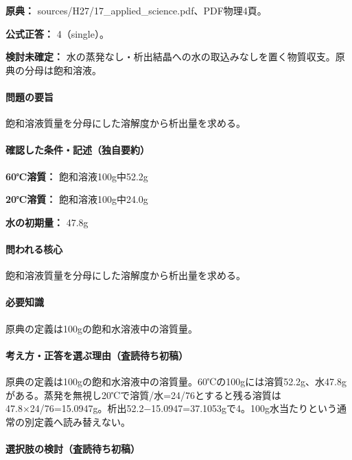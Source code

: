 \noindent\textbf{原典：} sources/H27/17\_applied\_science.pdf、PDF物理4頁。

\textbf{公式正答：} 4（single）。

\par\textbf{検討未確定：} 水の蒸発なし・析出結晶への水の取込みなしを置く物質収支。原典の分母は飽和溶液。

\paragraph{問題の要旨} 飽和溶液質量を分母にした溶解度から析出量を求める。

\paragraph{確認した条件・記述（独自要約）}\mbox{}\par

\noindent\textbf{60℃溶質：} 飽和溶液100g中52.2g\par

\noindent\textbf{20℃溶質：} 飽和溶液100g中24.0g\par

\noindent\textbf{水の初期量：} 47.8g\par

\paragraph{問われる核心} 飽和溶液質量を分母にした溶解度から析出量を求める。

\paragraph{必要知識} 原典の定義は100gの飽和水溶液中の溶質量。

\paragraph{考え方・正答を選ぶ理由（査読待ち初稿）} 原典の定義は100gの飽和水溶液中の溶質量。60℃の100gには溶質52.2g、水47.8gがある。蒸発を無視し20℃で溶質/水=24/76とすると残る溶質は47.8×24/76=\allowbreak{}15.0947g。析出52.2−15.0947=\allowbreak{}37.1053gで4。100g水当たりという通常の別定義へ読み替えない。

\paragraph{選択肢の検討（査読待ち初稿）}\mbox{}\par

